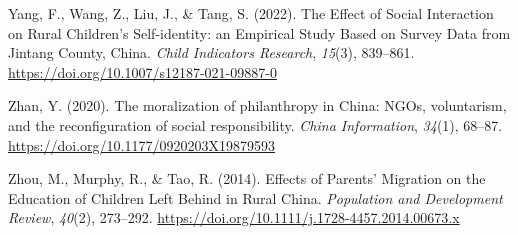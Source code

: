 \documentclass[
  man,floatsintext]{apa7}
\newlength{\cslhangindent}
\newlength{\cslentryspacingunit} %
\newenvironment{CSLReferences}[2] %
 {%
  \setlength{\parindent}{0pt}
  \ifodd #1
  \let\oldpar\par
  \def\par{\hangindent=\cslhangindent\oldpar}
  \fi
  \setlength{\parskip}{#2\cslentryspacingunit}
 }%
 {}
\begin{document}
\begin{CSLReferences}{1}{0}
\leavevmode{}%
Yang, F., Wang, Z., Liu, J., \& Tang, S. (2022). The Effect of Social Interaction on Rural Children{'}s Self-identity: an Empirical Study Based on Survey Data from Jintang County, China. \emph{Child Indicators Research}, \emph{15}(3), 839--861. \url{https://doi.org/10.1007/s12187-021-09887-0}

\leavevmode{}%
Zhan, Y. (2020). The moralization of philanthropy in China: NGOs, voluntarism, and the reconfiguration of social responsibility. \emph{China Information}, \emph{34}(1), 68--87. \url{https://doi.org/10.1177/0920203X19879593}

\leavevmode{}%
Zhou, M., Murphy, R., \& Tao, R. (2014). Effects of Parents' Migration on the Education of Children Left Behind in Rural China. \emph{Population and Development Review}, \emph{40}(2), 273--292. \url{https://doi.org/10.1111/j.1728-4457.2014.00673.x}

\end{CSLReferences}
\end{document}
